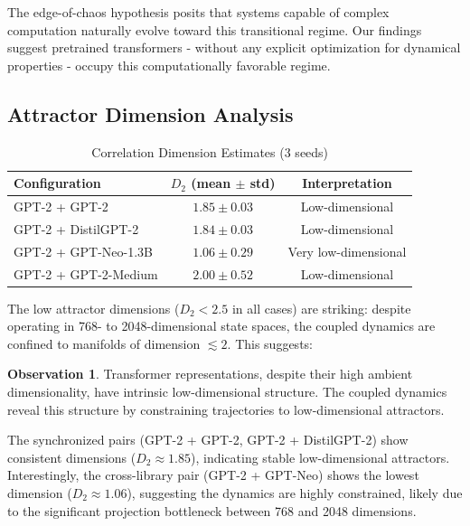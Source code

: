 \documentclass[10pt]{article} %
\theoremstyle{plain}
\theoremstyle{definition}
\newtheorem{observation}[theorem]{Observation}
\theoremstyle{remark}
\begin{document}
The edge-of-chaos hypothesis \citep{langton1990computation,packard1988adaptation} posits that systems capable of complex computation naturally evolve toward this transitional regime. Our findings suggest pretrained transformers - without any explicit optimization for dynamical properties - occupy this computationally favorable regime.

\subsection{Attractor Dimension Analysis}

\begin{table}[htbp]
\centering
\caption{Correlation Dimension Estimates (3 seeds)}
\label{tab:attractor}
\small
\begin{tabular}{lcc}
\toprule
\textbf{Configuration} & \textbf{$D_2$ (mean $\pm$ std)} & \textbf{Interpretation} \\
\midrule
GPT-2 + GPT-2 & $1.85 \pm 0.03$ & Low-dimensional \\
GPT-2 + DistilGPT-2 & $1.84 \pm 0.03$ & Low-dimensional \\
GPT-2 + GPT-Neo-1.3B & $1.06 \pm 0.29$ & Very low-dimensional \\
GPT-2 + GPT-2-Medium & $2.00 \pm 0.52$ & Low-dimensional \\
\bottomrule
\end{tabular}
\end{table}

The low attractor dimensions ($D_2 < 2.5$ in all cases) are striking: despite operating in 768- to 2048-dimensional state spaces, the coupled dynamics are confined to manifolds of dimension $\lesssim 2$. This suggests:

\begin{observation}
Transformer representations, despite their high ambient dimensionality, have intrinsic low-dimensional structure. The coupled dynamics reveal this structure by constraining trajectories to low-dimensional attractors.
\end{observation}

The synchronized pairs (GPT-2 + GPT-2, GPT-2 + DistilGPT-2) show consistent dimensions ($D_2 \approx 1.85$), indicating stable low-dimensional attractors. Interestingly, the cross-library pair (GPT-2 + GPT-Neo) shows the lowest dimension ($D_2 \approx 1.06$), suggesting the dynamics are highly constrained, likely due to the significant projection bottleneck between 768 and 2048 dimensions.
\end{document}

